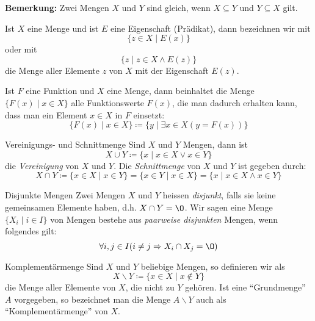 \vspace{-\topsep}

\textbf{Bemerkung: } Zwei Mengen $X$ und $Y$ sind gleich, wenn $X \subseteq Y$ und $Y \subseteq X$ gilt.

\begin{definition}{}
    Ist $X$ eine Menge und ist $E$ eine Eigenschaft (Prädikat), dann bezeichnen wir mit
    \[\{z \in X \mid E(x)\}\]
    oder mit
    \[\{z \mid z \in X \land E(z)\}\]
    die Menge aller Elemente $z$ von $X$ mit der Eigenschaft $E(z)$.
\end{definition}

\begin{definition}{}
    Ist $F$ eine Funktion und $X$ eine Menge, dann beinhaltet die Menge $\{F(x) \mid x \in X\}$ alle Funktionswerte $F(x)$, die man dadurch erhalten kann, dass man ein Element $x \in X$ in $F$ einsetzt: \[\{F(x) \mid x \in X\} \coloneqq \{ y \mid \exists x \in X (y = F(x))\}\]
\end{definition}

\begin{definition}{Vereinigungs- und Schnittmenge}
    Sind $X$ und $Y$ Mengen, dann ist \[X \cup Y \coloneqq \{x \mid x \in X \lor x \in Y \}\] die \emph{Vereinigung} von $X$ und $Y$.
    Die \emph{Schnittmenge} von $X$ und $Y$ ist gegeben durch: \[X \cap Y \coloneqq \{x \in X \mid x \in Y\} = \{x \in Y \mid x \in X\} = \{x \mid x \in X \land x \in Y\}\]
\end{definition}

\begin{definition}{Disjunkte Mengen}
    Zwei Mengen $X$ und $Y$ heissen \emph{disjunkt}, falls sie keine gemeinsamen Elemente haben, d.h. $X \cap Y = \O$.
    Wir sagen eine Menge $\{X_i \mid i \in I\}$ von Mengen bestehe aus \emph{paarweise disjunkten} Mengen, wenn folgendes gilt: \[\forall i,j \in I (i \neq j \Rightarrow X_i \cap X_j = \O)\]
\end{definition}

\begin{definition}{Komplementärmenge}
    Sind $X$ und $Y$ beliebige Mengen, so definieren wir als \[X \backslash Y \coloneqq \{x \in X \mid x \not \in Y \}\] die Menge aller Elemente von $X$, die nicht zu $Y$ gehören.
    Ist eine ``Grundmenge'' $A$ vorgegeben, so bezeichnet man die Menge $A \backslash Y$ auch als ``Komplementärmenge'' von $X$.
\end{definition}

